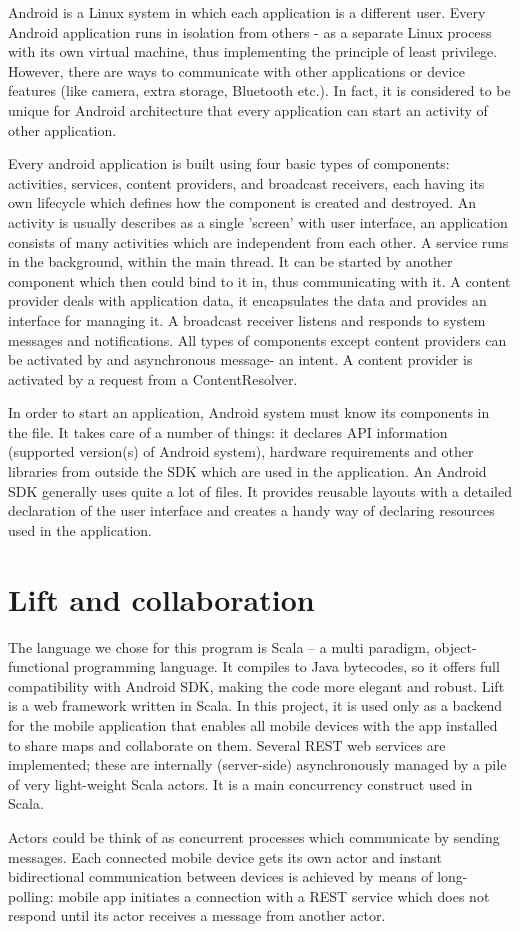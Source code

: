 Android is a Linux system in which each application is a different user. Every Android application runs in isolation from others - as a separate Linux process with its own virtual machine, thus implementing the principle of least privilege. However,  there are ways to communicate with other applications or device features (like camera, extra storage, Bluetooth etc.). In fact, it is considered to be unique for Android architecture that every application can start an activity of other application.

Every android application is built using four basic types of components: activities, services, content providers, and broadcast receivers, each having its own lifecycle which defines how the component is created and destroyed. An activity is usually describes as a single 'screen' with user interface, an application consists of many activities which are independent from each other. A service runs in the background, within the main thread. It can be started by another component which then could bind to it in, thus communicating with it. A content provider deals with application data, it encapsulates the data and provides an interface for managing it. A broadcast receiver  listens and responds to system messages and notifications. All types of components except content providers can be activated by and asynchronous message- an intent. A content provider is activated by a request from a ContentResolver.

In order to start an application, Android system must know its components in the  file. It takes care of a number of things: it declares API information (supported version(s) of Android system), hardware requirements and other libraries from outside the SDK which are used in the application. An Android SDK generally uses quite a lot of  files. It provides reusable layouts with a detailed declaration of the user interface and creates a handy way of declaring resources used in the application.

\section{Lift and collaboration}
\label{lift}


The language we chose for this program is Scala -- a multi paradigm, object-functional programming language. It compiles to Java bytecodes, so it offers full compatibility with Android SDK, making the code more elegant and robust. Lift is a web framework written in Scala. In this project, it is used only as a backend for the mobile application that enables all mobile devices with the app installed to share maps and collaborate on them. Several REST web services are implemented; these are internally (server-side) asynchronously managed by a pile of very light-weight Scala actors. It is a main concurrency construct used in Scala.

Actors could be think of as concurrent processes which communicate by sending messages. Each connected mobile device gets its own actor and instant bidirectional communication between devices is achieved by means of long-polling: mobile app initiates a connection with a REST service which does not respond until its actor receives a message from another actor.
